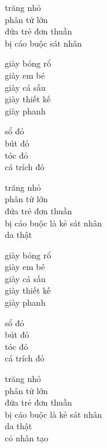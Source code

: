 \documentclass{article}
\begin{document}
\begin{huge}
trăng nhỏ\\
phân tử lớn \\
đứa trẻ đơn thuần\\
bị cáo buộc sát nhân


giày bóng rổ\\
giày em bé\\
giày cá sấu \\
giày thiết kế \\
giày phanh

sổ đỏ\\
bút đỏ\\
tóc đỏ\\
cá trích đỏ

trăng nhỏ\\
phân tử lớn \\
đứa trẻ đơn thuần\\
bị cáo buộc là kẻ sát nhân\\
da thật


giày bóng rổ\\
giày em bé\\
giày cá sấu \\
giày thiết kế \\
giày phanh

sổ đỏ\\
bút đỏ\\
tóc đỏ\\
cá trích đỏ

trăng nhỏ\\
phân tử lớn \\
đứa trẻ đơn thuần\\
bị cáo buộc là kẻ sát nhân\\
da thật\\
cỏ nhân tạo



\end{huge}
\end{document}
